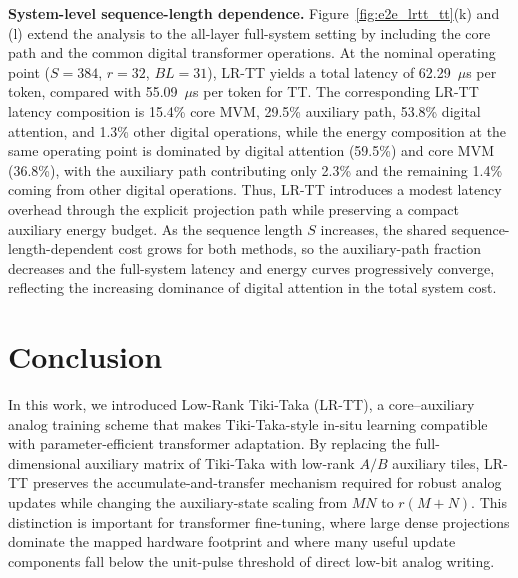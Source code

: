 \documentclass[AMA,LATO2COL]{WileyNJDv5}
\begin{document}
\noindent\textbf{System-level sequence-length dependence.}
Figure~\ref{fig:e2e_lrtt_tt}(k) and (l) extend the analysis to the all-layer full-system setting by including the core path and the common digital transformer operations. At the nominal operating point (\(S=384\), \(r=32\), \(BL=31\)), LR-TT yields a total latency of 62.29~\(\mu\)s per token, compared with 55.09~\(\mu\)s per token for TT. The corresponding LR-TT latency composition is 15.4\% core MVM, 29.5\% auxiliary path, 53.8\% digital attention, and 1.3\% other digital operations, while the energy composition at the same operating point is dominated by digital attention (59.5\%) and core MVM (36.8\%), with the auxiliary path contributing only 2.3\% and the remaining 1.4\% coming from other digital operations. Thus, LR-TT introduces a modest latency overhead through the explicit projection path while preserving a compact auxiliary energy budget. As the sequence length \(S\) increases, the shared sequence-length-dependent cost grows for both methods, so the auxiliary-path fraction decreases and the full-system latency and energy curves progressively converge, reflecting the increasing dominance of digital attention in the total system cost.
\section{Conclusion}
\label{sec:conclusion}

In this work, we introduced Low-Rank Tiki-Taka (LR-TT), a core--auxiliary analog training scheme that makes Tiki-Taka-style in-situ learning compatible with parameter-efficient transformer adaptation. By replacing the full-dimensional auxiliary matrix of Tiki-Taka with low-rank \(A/B\) auxiliary tiles, LR-TT preserves the accumulate-and-transfer mechanism required for robust analog updates while changing the auxiliary-state scaling from \(MN\) to \(r(M+N)\). This distinction is important for transformer fine-tuning, where large dense projections dominate the mapped hardware footprint and where many useful update components fall below the unit-pulse threshold of direct low-bit analog writing.
\end{document}
